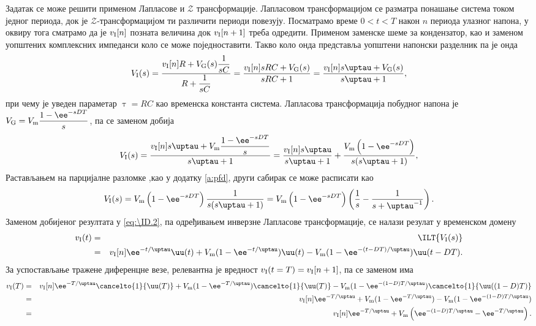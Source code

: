 Задатак се може решити применом Лапласове и $\mathcal{Z}$ трансформације. Лапласовом трансформацијом се разматра понашање система током једног периода, 
док је $\mathcal{Z}$-трансформацијом ти различити периоди повезују. Посматрамо време $0 < t < T$ након $n$ периода улазног напона, у оквиру тога 
сматрамо да је $v_{\rm I}[n]$ позната величина док $v_{\rm I}[n+1]$ треба одредити. Применом заменске шеме за кондензатор, као и заменом уопштених 
комплексних импеданси коло се може поједноставити. Такво коло онда представља уопштени напонски разделник па је онда 
\begin{eqnarray}
    V_{\rm I}(s) = \dfrac{v_{\rm I}[n] R + V_{\rm G}(s) \dfrac{1}{sC}}{R + \dfrac{1}{sC}} = 
    \dfrac{v_{\rm I}[n] sRC + V_{\rm G}(s) }{sRC + 1} = \dfrac{v_{\rm I}[n] s \uptau + V_{\rm G}(s) }{s\uptau + 1},
\end{eqnarray}
при чему је уведен параметар $\uptau = RC$ као временска константа система. Лапласова трансформација побудног напона је 
$V_{\rm G} = V_{\rm m}\dfrac{1 - \ee^{-sDT}}{s}$, па се заменом добија 
\begin{eqnarray}
    V_{\rm I}(s) = \dfrac{v_{\rm I}[n] s \uptau + V_{\rm m}\dfrac{1 - \ee^{-sDT}}{s} }{s\uptau + 1} =
       \dfrac{v_{\rm I}[n] s \uptau }{s \uptau + 1} +
       \dfrac{V_{\rm m}\left(1 - \ee^{-sDT}\right) }{s(s\uptau + 1)}, \label{eq:\ID.2}
\end{eqnarray}
Растављањем на парцијалне разломке ,као у додатку \ref{a:pfd}, други сабирак се може расписати као  
\begin{eqnarray}
    V_{\rm I}(s) = 
    V_{\rm m} \left(1 - \ee^{-sDT}\right) \dfrac{ 1 }{s(s\uptau + 1)} 
    = 
    V_{\rm m} \left(1 - \ee^{-sDT}\right) \left(\dfrac{1}{s} - \dfrac{1}{s + \uptau^{-1}} \right).
\end{eqnarray}
Заменом добијеног резултата у \eqref{eq:\ID.2}, па одређивањем инверзне Лапласове трансформације, се налази резулат у временском домену
\begin{eqnarray}
    v_{\rm I}(t) &=& \ILT{V_{\rm I}(s)} \\
    &=& 
    v _{\rm I}[n] \ee^{-t/\uptau} \uu(t)
    +
    V_{\rm m}(1 - \ee^{-t/\uptau}) \uu(t)
    -
    V_{\rm m}(1 - \ee^{-(t-DT)/\uptau}) \uu(t-DT).
\end{eqnarray}
За успостављање тражене диференцне везе, релевантна је вредност $v_{\rm I}(t = T) = v_{\rm I}[n+1]$, па се заменом има
\begin{eqnarray}
    v_{\rm I}(T)
    &=&
    v _{\rm I}[n] \ee^{-T/\uptau} \cancelto{1}{\uu(T)}
    +
    V_{\rm m}(1 - \ee^{-T/\uptau}) \cancelto{1}{\uu(T)}
    -
    V_{\rm m}(1 - \ee^{-(1-D)T/\uptau}) \cancelto{1}{\uu((1-D)T)}
    \\
    &=&
    v _{\rm I}[n] \ee^{-T/\uptau}
    +
    V_{\rm m}(1 - \ee^{-T/\uptau})
    -
    V_{\rm m}(1 - \ee^{-(1-D)T/\uptau})
    \\ 
    &=&
    v _{\rm I}[n] \ee^{-T/\uptau}
    +
    V_{\rm m}
    \left(
         \ee^{-(1-D)T/\uptau} - \ee^{-T/\uptau}
    \right).
\end{eqnarray}
